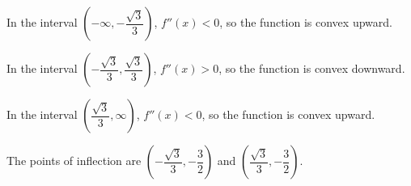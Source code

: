\begin{enumerate}[resume]
          In the interval $\left(-\infty, -\dfrac{\sqrt{3}}{3}\right)$, $f''(x) < 0$, so
          the function is convex upward.

          In the interval $\left(-\dfrac{\sqrt{3}}{3}, \dfrac{\sqrt{3}}{3}\right)$,
          $f''(x) > 0$, so the function is convex downward.

          In the interval $\left(\dfrac{\sqrt{3}}{3}, \infty\right)$, $f''(x) < 0$, so
          the function is convex upward.

          The points of inflection are $\left(-\dfrac{\sqrt{3}}{3}, -\dfrac{3}{2}\right)$
          and $\left(\dfrac{\sqrt{3}}{3}, -\dfrac{3}{2}\right)$.
\end{enumerate}